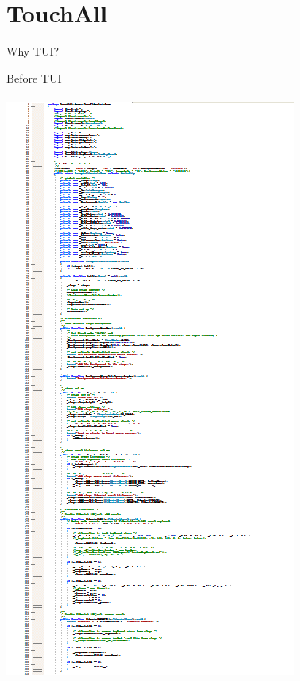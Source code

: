 \section{TouchAll}
\begin{frame}%
\begin{block}{Why TUI?}
\begin{minipage}{1.0\linewidth}
\begin{center}
\begin{minipage}{.39\linewidth}
\begin{center}
Before TUI\\$\;$\\
\includegraphics[scale=0.18]{images/old_part1.png}\\

\end{center}
\end{minipage}
\end{center}
\end{minipage}
\end{block}
\end{frame}
